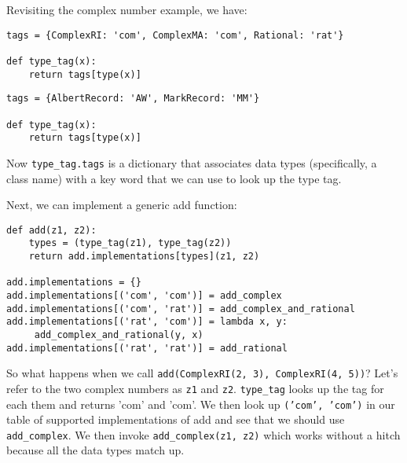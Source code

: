 Revisiting the complex number example, we have:

\begin{lstlisting}
tags = {ComplexRI: 'com', ComplexMA: 'com', Rational: 'rat'}

def type_tag(x):
    return tags[type(x)]
\end{lstlisting}


\begin{lstlisting}
tags = {AlbertRecord: 'AW', MarkRecord: 'MM'}

def type_tag(x):
    return tags[type(x)]
\end{lstlisting}

Now {\tt type\_tag.tags} is a dictionary that associates data types
(specifically, a class name) with a key word that we can use to look up
the type tag.

Next, we can implement a generic add function:

\begin{lstlisting}
def add(z1, z2):
    types = (type_tag(z1), type_tag(z2))
    return add.implementations[types](z1, z2)

add.implementations = {}
add.implementations[('com', 'com')] = add_complex
add.implementations[('com', 'rat')] = add_complex_and_rational
add.implementations[('rat', 'com')] = lambda x, y:
     add_complex_and_rational(y, x)
add.implementations[('rat', 'rat')] = add_rational
\end{lstlisting}

So what happens when we call {\tt add(ComplexRI(2, 3), ComplexRI(4,
5))}?  Let's refer to the two complex numbers as {\tt z1} and {\tt z2}.
{\tt type\_tag} looks up the tag for each them and returns 'com' and
'com'. We then look up {\tt ('com', 'com')} in our table of supported
implementations of add and see that we should use {\tt add\_complex}.
We then invoke {\tt add\_complex(z1, z2)} which works without a hitch
because all the data types match up.
